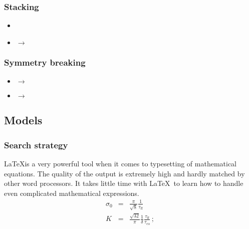 \documentclass[a4paper,10pt]{article}
\newcommand{\xmark}{\ding{55}}%
\newcounter{subsubsubsection}[subsubsection]
\begin{document}
 \label{sec:present-at-origin}
 \label{sec:intervals-approach}
 \label{sec:anchor-points-v1}
 \label{sec:anchor-points-v2}

\subsubsection{Stacking}
\begin{itemize}
   \item {}
   \item {} $\rightarrow$ 
\end{itemize}

 \label{sec:cumulative}
 \label{sec:stack-two}
 \label{sec:column-stacking}

\subsubsection{Symmetry breaking}
\begin{itemize}
   \item {} $\rightarrow$ 
   \item {} $\rightarrow$ \xmark
\end{itemize}

 \label{sec:biggest-lower-left}
 \label{sec:areas-ordering}
 \label{sec:width-ordering}


\subsection{Models}

\subsubsection*{Search strategy}

\LaTeX is a very powerful tool when it comes to typesetting of
mathematical equations. The quality of the output is extremely
high and hardly matched by other word processors. It takes little
time with {\LaTeX\,}  to learn how to handle
even complicated mathematical expressions.
\begin{eqnarray}
   \sigma_0 & = & \frac{\pi}{\sqrt{8}}
   \frac{1}{ \tau_{\mathrm{ff}}} \\
   K        & = & \frac{\sqrt{32}}{\pi} \frac{1}{\delta}
   \frac{ \tau_{\mathrm{ff}} }
   { \tau_{\mathrm{co}} }\,;
\end{eqnarray}
\end{document}
